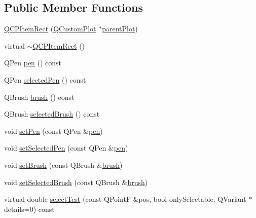 \subsection*{Public Member Functions}
\begin{DoxyCompactItemize}
\item 
\hyperlink{class_q_c_p_item_rect_a412ad1579f7a1fba453d0fa28c496cbc}{Q\+C\+P\+Item\+Rect} (\hyperlink{class_q_custom_plot}{Q\+Custom\+Plot} $\ast$\hyperlink{class_q_c_p_layerable_ab7e0e94461566093d36ffc0f5312b109}{parent\+Plot})
\item 
virtual \hyperlink{class_q_c_p_item_rect_af9e89f80457afc2d0fd2c6527b40a5f2}{$\sim$\+Q\+C\+P\+Item\+Rect} ()
\item 
Q\+Pen \hyperlink{class_q_c_p_item_rect_a3cb7b6de5e82cc5a3c99e9de919a55e6}{pen} () const 
\item 
Q\+Pen \hyperlink{class_q_c_p_item_rect_a7e701c34e72a4c25647e93fa369f395c}{selected\+Pen} () const 
\item 
Q\+Brush \hyperlink{class_q_c_p_item_rect_a03d2d26ffcac78b25b8e90915f9c4abe}{brush} () const 
\item 
Q\+Brush \hyperlink{class_q_c_p_item_rect_a3b586228393f5c8efa78c4d2a4b25cbf}{selected\+Brush} () const 
\item 
void \hyperlink{class_q_c_p_item_rect_a483c0da5a17e1646cd17ddea2c124e7d}{set\+Pen} (const Q\+Pen \&\hyperlink{class_q_c_p_item_rect_a3cb7b6de5e82cc5a3c99e9de919a55e6}{pen})
\item 
void \hyperlink{class_q_c_p_item_rect_a52a1bcb2dc753a538e406a2ba3cf21ce}{set\+Selected\+Pen} (const Q\+Pen \&\hyperlink{class_q_c_p_item_rect_a3cb7b6de5e82cc5a3c99e9de919a55e6}{pen})
\item 
void \hyperlink{class_q_c_p_item_rect_abbd4e346a03513ee466afc25d9c75446}{set\+Brush} (const Q\+Brush \&\hyperlink{class_q_c_p_item_rect_a03d2d26ffcac78b25b8e90915f9c4abe}{brush})
\item 
void \hyperlink{class_q_c_p_item_rect_abd1792859844118dedee86223cede7af}{set\+Selected\+Brush} (const Q\+Brush \&\hyperlink{class_q_c_p_item_rect_a03d2d26ffcac78b25b8e90915f9c4abe}{brush})
\item 
virtual double \hyperlink{class_q_c_p_item_rect_af13b0797079b40b73d1c7286b76f18ac}{select\+Test} (const Q\+Point\+F \&pos, bool only\+Selectable, Q\+Variant $\ast$details=0) const 
\end{DoxyCompactItemize}
